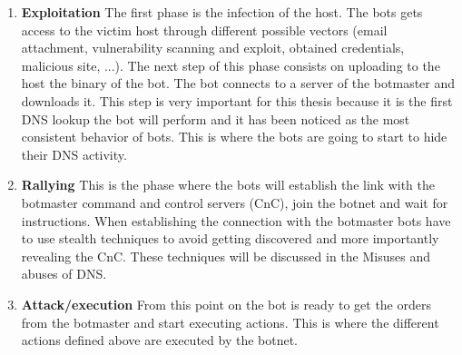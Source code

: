 \begin{enumerate}
\item \textbf{Exploitation} The first phase is the infection of the host. The bots gets access to the victim host through different possible vectors (email attachment, vulnerability scanning and exploit, obtained credentials, malicious site, ...). The next step of this phase consists on uploading to the host the binary of the bot. 
The bot connects to a server of the botmaster and downloads it. This step is very important for this thesis because it is the first DNS lookup the bot will perform and it has been noticed as the most consistent behavior of bots. This is where the bots are going to start to hide their DNS activity.
\item \textbf{Rallying} This is the phase where the bots will establish the link with the botmaster command and control servers (CnC), join the botnet and wait for instructions. When establishing the connection with the botmaster bots have to use stealth techniques to avoid getting discovered and more importantly revealing the CnC. These techniques will be discussed in the Misuses and abuses of DNS.
\item \textbf{Attack/execution} From this point on the bot is ready to get the orders from the botmaster and start executing actions. This is where the different actions defined above are executed by the botnet.

\end{enumerate}
